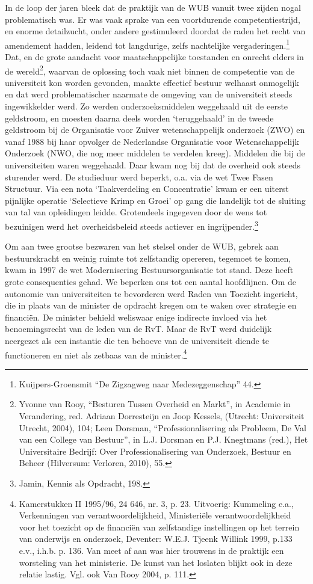 \documentclass{jote-book}
\begin{document}
	In de loop der jaren bleek dat de praktijk van de WUB vanuit twee zijden nogal problematisch was. Er was vaak sprake van een voortdurende competentiestrijd, en enorme detailzucht, onder andere gestimuleerd doordat de raden het recht van amendement hadden, leidend tot langdurige, zelfs nachtelijke vergaderingen.\footnote{Kuijpers-Groensmit “De Zigzagweg naar Medezeggenschap” 44.} Dat, en de grote aandacht voor maatschappelijke toestanden en onrecht elders in de wereld\footnote{Yvonne van Rooy, “Besturen Tussen Overheid en Markt”, in Academie in Verandering, red. Adriaan Dorresteijn en Joop Kessels, (Utrecht: Universiteit Utrecht, 2004), 104; Leen Dorsman, “Professionalisering als Probleem, De Val van een College van Bestuur”, in L.J. Dorsman en P.J. Knegtmans (red.), Het Universitaire Bedrijf: Over Professionalisering van Onderzoek, Bestuur en Beheer (Hilversum: Verloren, 2010), 55. }, waarvan de oplossing toch vaak niet binnen de competentie van de universiteit kon worden gevonden, maakte effectief bestuur welhaast onmogelijk en dat werd problematischer naarmate de omgeving van de universiteit steeds ingewikkelder werd. Zo werden onderzoeksmiddelen weggehaald uit de eerste geldstroom, en moesten daarna deels worden ‘teruggehaald' in de tweede geldstroom bij de Organisatie voor Zuiver wetenschappelijk onderzoek (ZWO) en vanaf 1988 bij haar opvolger de Nederlandse Organisatie voor Wetenschappelijk Onderzoek (NWO, die nog meer middelen te verdelen kreeg). Middelen die bij de universiteiten waren weggehaald. Daar kwam nog bij dat de overheid ook steeds sturender werd. De studieduur werd beperkt, o.a. via de wet Twee Fasen Structuur. Via een nota ‘Taakverdeling en Concentratie' kwam er een uiterst pijnlijke operatie ‘Selectieve Krimp en Groei' op gang die landelijk tot de sluiting van tal van opleidingen leidde. Grotendeels ingegeven door de wens tot bezuinigen werd het overheidsbeleid steeds actiever en ingrijpender.\footnote{Jamin, Kennis als Opdracht, 198.}



	Om aan twee grootse bezwaren van het stelsel onder de WUB, gebrek aan bestuurskracht en weinig ruimte tot zelfstandig opereren, tegemoet te komen, kwam in 1997 de wet Modernisering Bestuursorganisatie tot stand. Deze heeft grote consequenties gehad. We beperken ons tot een aantal hoofdlijnen. Om de autonomie van universiteiten te bevorderen werd Raden van Toezicht ingericht, die in plaats van de minister de opdracht kregen om te waken over strategie en financiën. De minister behield weliswaar enige indirecte invloed via het benoemingsrecht van de leden van de RvT. Maar de RvT werd duidelijk neergezet als een instantie die ten behoeve van de universiteit diende te functioneren en niet als zetbaas van de minister.\footnote{Kamerstukken II 1995/96, 24 646, nr. 3, p. 23. Uitvoerig: Kummeling e.a., Verkenningen van verantwoordelijkheid, Ministeriële verantwoordelijkheid voor het toezicht op de financiën van zelfstandige instellingen op het terrein van onderwijs en onderzoek, Deventer: W.E.J. Tjeenk Willink 1999, p.133 e.v., i.h.b. p. 136. Van meet af aan was hier trouwens in de praktijk een worsteling van het ministerie. De kunst van het loslaten blijkt ook in deze relatie lastig. Vgl. ook Van Rooy 2004, p. 111. }
\end{document}
